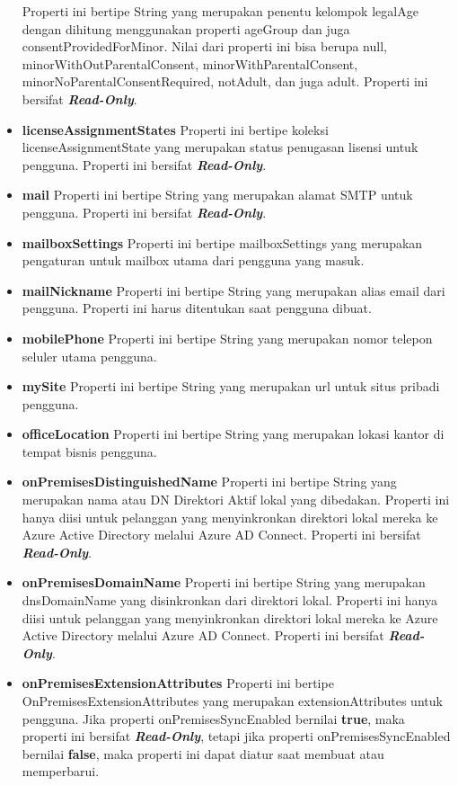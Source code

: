 \begin{itemize}
	Properti ini bertipe String yang merupakan penentu kelompok legalAge dengan dihitung menggunakan properti ageGroup dan juga consentProvidedForMinor. Nilai dari properti ini bisa berupa null, minorWithOutParentalConsent, minorWithParentalConsent, minorNoParentalConsentRequired, notAdult, dan juga adult. Properti ini bersifat \textbf{\textit{Read-Only}}.
	 \item \textbf{licenseAssignmentStates}
	Properti ini bertipe koleksi licenseAssignmentState yang merupakan status penugasan lisensi untuk pengguna. Properti ini bersifat \textbf{\textit{Read-Only}}.
	\item \textbf{mail}
	Properti ini bertipe String yang merupakan alamat SMTP untuk pengguna. Properti ini bersifat \textbf{\textit{Read-Only}}.
	\item \textbf{mailboxSettings}
	Properti ini bertipe mailboxSettings yang merupakan pengaturan untuk mailbox utama dari pengguna yang masuk.
	\item \textbf{mailNickname}
	Properti ini bertipe String yang merupakan alias email dari pengguna. Properti ini harus ditentukan saat pengguna dibuat. 
	\item \textbf{mobilePhone}
	Properti ini bertipe String yang merupakan nomor telepon seluler utama pengguna.
	\item \textbf{mySite}
	Properti ini bertipe String yang merupakan url untuk situs pribadi pengguna.
	\item \textbf{officeLocation}
	Properti ini bertipe String yang merupakan lokasi kantor di tempat bisnis pengguna.
	\item \textbf{onPremisesDistinguishedName}
	Properti ini bertipe String yang merupakan nama atau DN Direktori Aktif lokal yang dibedakan. Properti ini hanya diisi untuk pelanggan yang menyinkronkan direktori lokal mereka ke Azure Active Directory melalui Azure AD Connect. Properti ini bersifat \textbf{\textit{Read-Only}}.
	\item \textbf{onPremisesDomainName}
	Properti ini bertipe String yang merupakan dnsDomainName yang disinkronkan dari direktori lokal. Properti ini hanya diisi untuk pelanggan yang menyinkronkan direktori lokal mereka ke Azure Active Directory melalui Azure AD Connect. Properti ini bersifat \textbf{\textit{Read-Only}}.
	\item \textbf{onPremisesExtensionAttributes}
	Properti ini bertipe OnPremisesExtensionAttributes yang merupakan extensionAttributes untuk pengguna. Jika properti onPremisesSyncEnabled bernilai \textbf{true}, maka properti ini bersifat \textbf{\textit{Read-Only}}, tetapi jika properti onPremisesSyncEnabled bernilai \textbf{false}, maka properti ini dapat diatur saat membuat atau memperbarui.

\end{itemize}
